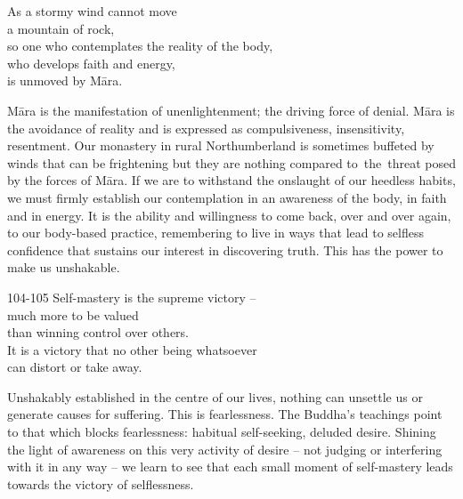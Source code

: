 
\begin{dhpVerse}{8}
\label{dhp-8}
As a stormy wind cannot move\\
a mountain of rock,\\
so one who contemplates the reality of the body,\\
who develops faith and energy,\\
is unmoved by Māra.
\end{dhpVerse}

\begin{dhpRefl}

Māra is the manifestation of unenlightenment; the driving force of
denial. Māra is the avoidance of reality and is expressed as
compulsiveness, insensitivity, resentment. Our monastery in rural
Northumberland is sometimes buffeted by winds that can be frightening
but they are nothing compared to the threat posed by the forces of
Māra. If we are to withstand the onslaught of our heedless habits, we
must firmly establish our contemplation in an awareness of the body,
in faith and in energy. It is the ability and willingness to come
back, over and over again, to our body-based practice, remembering to
live in ways that lead to selfless confidence that sustains our
interest in discovering truth. This has the power to make us
unshakable.

\end{dhpRefl}


\begin{dhpVerse}{104-105}
\label{dhp-104}\label{dhp-105}
Self-mastery is the supreme victory --\\
much more to be valued\\
than winning control over others.\\
It is a victory that no other being whatsoever\\
can distort or take away.
\end{dhpVerse}

\begin{dhpRefl}

Unshakably established in the centre of our lives, nothing can
unsettle us or generate causes for suffering. This is fearlessness.
The Buddha's teachings point to that which blocks fearlessness:
habitual self-seeking, deluded desire. Shining the light of awareness
on this very activity of desire -- not judging or interfering with it
in any way -- we learn to see that each small moment of self-mastery
leads towards the victory of selflessness.

\end{dhpRefl}

